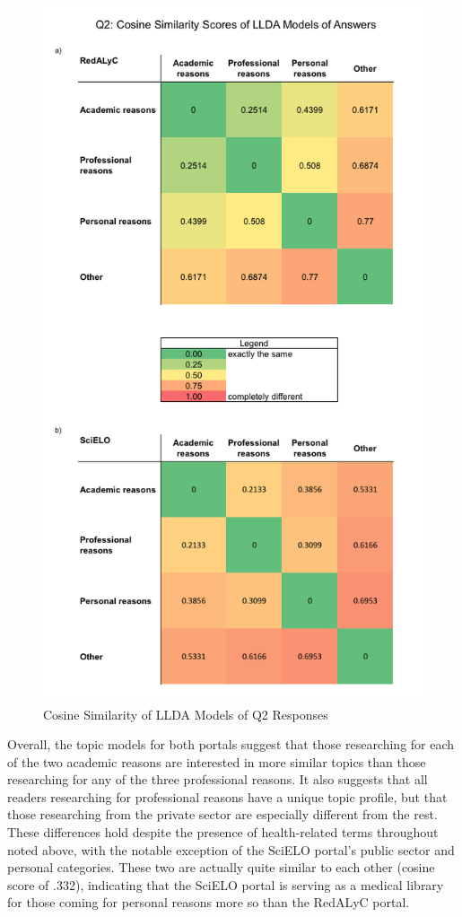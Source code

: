 \begin{figure}[htbp]
\centering
\includegraphics[keepaspectratio,width=\textwidth,height=0.95\textheight]{figures/llda_cosine_similarity_q2.png}
\caption{Cosine Similarity of LLDA Models of Q2 Responses}
\label{llda_cosine_similarity_q2}
\end{figure}

Overall, the topic models for both portals suggest that those researching for each of the two academic reasons are interested in more similar topics than those researching for any of the three professional reasons. It also suggests that all readers researching for professional reasons have a unique topic profile, but that those researching from the private sector are especially different from the rest. These differences hold despite the presence of health-related terms throughout noted above, with the notable exception of the SciELO portal's public sector and personal categories. These two are actually quite similar to each other (cosine score of .332), indicating that the SciELO portal is serving as a medical library for those coming for personal reasons more so than the RedALyC portal.

